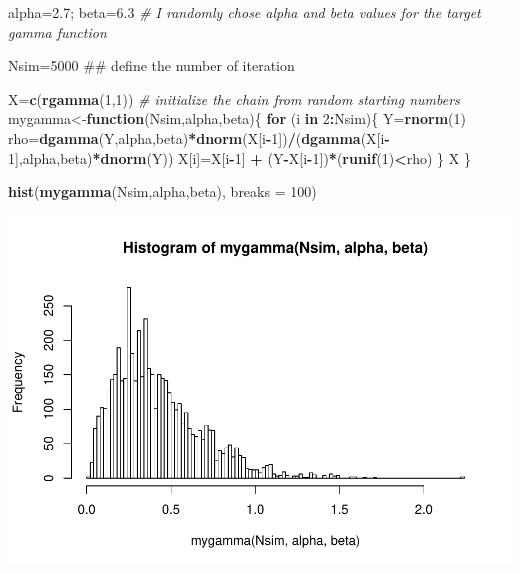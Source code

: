 \documentclass[]{book}
\newenvironment{Shaded}{\begin{snugshade}}{\end{snugshade}}
\newcommand{\KeywordTok}[1]{\textcolor[rgb]{0.13,0.29,0.53}{\textbf{#1}}}
\newcommand{\DataTypeTok}[1]{\textcolor[rgb]{0.13,0.29,0.53}{#1}}
\newcommand{\DecValTok}[1]{\textcolor[rgb]{0.00,0.00,0.81}{#1}}
\newcommand{\FloatTok}[1]{\textcolor[rgb]{0.00,0.00,0.81}{#1}}
\newcommand{\StringTok}[1]{\textcolor[rgb]{0.31,0.60,0.02}{#1}}
\newcommand{\CommentTok}[1]{\textcolor[rgb]{0.56,0.35,0.01}{\textit{#1}}}
\newcommand{\ControlFlowTok}[1]{\textcolor[rgb]{0.13,0.29,0.53}{\textbf{#1}}}
\newcommand{\OperatorTok}[1]{\textcolor[rgb]{0.81,0.36,0.00}{\textbf{#1}}}
\newcommand{\NormalTok}[1]{#1}
\begin{document}
\begin{Shaded}
\begin{Highlighting}[]
\NormalTok{alpha=}\FloatTok{2.7}\NormalTok{; beta=}\FloatTok{6.3} \CommentTok{# I randomly chose alpha and beta values for the target gamma function}

\NormalTok{Nsim=}\DecValTok{5000}\NormalTok{  ## define the number of iteration }

\NormalTok{X=}\KeywordTok{c}\NormalTok{(}\KeywordTok{rgamma}\NormalTok{(}\DecValTok{1}\NormalTok{,}\DecValTok{1}\NormalTok{)) }\CommentTok{# initialize the chain from random starting numbers}
\NormalTok{mygamma<-}\ControlFlowTok{function}\NormalTok{(Nsim,alpha,beta)\{}
\ControlFlowTok{for}\NormalTok{ (i }\ControlFlowTok{in} \DecValTok{2}\OperatorTok{:}\NormalTok{Nsim)\{}
\NormalTok{  Y=}\KeywordTok{rnorm}\NormalTok{(}\DecValTok{1}\NormalTok{)}
\NormalTok{  rho=}\KeywordTok{dgamma}\NormalTok{(Y,alpha,beta)}\OperatorTok{*}\KeywordTok{dnorm}\NormalTok{(X[i}\OperatorTok{-}\DecValTok{1}\NormalTok{])}\OperatorTok{/}\NormalTok{(}\KeywordTok{dgamma}\NormalTok{(X[i}\OperatorTok{-}\DecValTok{1}\NormalTok{],alpha,beta)}\OperatorTok{*}\KeywordTok{dnorm}\NormalTok{(Y))}
\NormalTok{  X[i]=X[i}\OperatorTok{-}\DecValTok{1}\NormalTok{] }\OperatorTok{+}\StringTok{ }\NormalTok{(Y}\OperatorTok{-}\NormalTok{X[i}\OperatorTok{-}\DecValTok{1}\NormalTok{])}\OperatorTok{*}\NormalTok{(}\KeywordTok{runif}\NormalTok{(}\DecValTok{1}\NormalTok{)}\OperatorTok{<}\NormalTok{rho)}
\NormalTok{\}}
\NormalTok{X}
\NormalTok{\}}

\KeywordTok{hist}\NormalTok{(}\KeywordTok{mygamma}\NormalTok{(Nsim,alpha,beta), }\DataTypeTok{breaks =} \DecValTok{100}\NormalTok{)}
\end{Highlighting}
\end{Shaded}

\includegraphics{bookdown-demo_files/figure-latex/unnamed-chunk-26-1.pdf}
\end{document}
